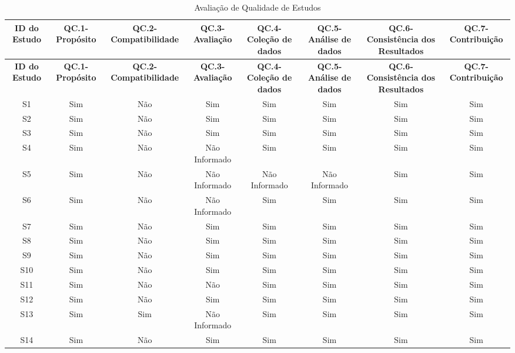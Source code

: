 \begin{landscape}
	\tiny
	\begin{longtable}{|c|c|c|c|c|c|c|c|}
		\caption{Avaliação de Qualidade de Estudos}
		\label{table:ranking} \\\hline
		\textbf{ID do Estudo} &
		\textbf{QC.1-Propósito} &
		\textbf{QC.2-Compatibilidade} &
		\textbf{QC.3-Avaliação} &
		\textbf{QC.4-Coleção de dados} &
		\textbf{QC.5-Análise de dados} &
		\textbf{QC.6-Consistência dos Resultados} &
		\textbf{QC.7-Contribuição} 
		\\\hline \hline
		\endfirsthead
		
		
		\textbf{ID do Estudo} &
		\textbf{QC.1-Propósito} &
		\textbf{QC.2-Compatibilidade} &
		\textbf{QC.3-Avaliação} &
		\textbf{QC.4-Coleção de dados} &
		\textbf{QC.5-Análise de dados} &
		\textbf{QC.6-Consistência dos Resultados} &
		\textbf{QC.7-Contribuição} 
		\\\hline \hline
		\endhead
		S1 & Sim & Não & Sim & Sim & Sim & Sim & Sim \\\hline
		S2 & Sim & Não & Sim & Sim & Sim & Sim & Sim \\\hline
		S3 & Sim & Não & Sim & Sim & Sim & Sim & Sim \\\hline
		S4 & Sim & Não & Não Informado & Sim & Sim & Sim & Sim \\\hline
		S5 & Sim & Não & Não Informado & Não Informado & Não Informado & Sim & Sim \\\hline
		S6 & Sim & Não & Não Informado & Sim & Sim & Sim & Sim \\\hline
		S7 & Sim & Não & Sim & Sim & Sim & Sim & Sim \\\hline
		S8 & Sim & Não & Sim & Sim & Sim & Sim & Sim \\\hline
		S9 & Sim & Não & Sim & Sim & Sim & Sim & Sim \\\hline
		S10 & Sim & Não & Sim & Sim & Sim & Sim & Sim \\\hline
		S11 & Sim & Não & Não & Sim & Sim & Sim & Sim \\\hline
		S12 & Sim & Não & Sim & Sim & Sim & Sim & Sim \\\hline
		S13 & Sim & Sim & Não Informado & Sim & Sim & Sim & Sim \\\hline
		S14 & Sim & Não & Sim & Sim & Sim & Sim & Sim \\\hline

\end{longtable}
\end{landscape}
